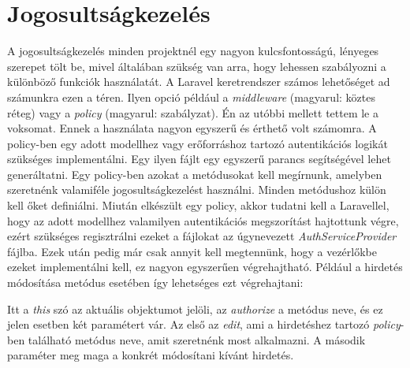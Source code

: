 \documentclass[]{thesis-ekf}
\theoremstyle{definition}
\theoremstyle{remark}
\begin{document}
	\section{Jogosultságkezelés}
		A jogosultságkezelés minden projektnél egy nagyon kulcsfontosságú, lényeges szerepet tölt be, mivel általában szükség van arra, hogy lehessen szabályozni a különböző funkciók használatát. A Laravel keretrendszer számos lehetőséget ad számunkra ezen a téren. Ilyen opció például a \emph{middleware} (magyarul: köztes réteg) vagy a \emph{policy} (magyarul: szabályzat). Én az utóbbi mellett tettem le a voksomat. Ennek a használata nagyon egyszerű és érthető volt számomra. A policy-ben egy adott modellhez vagy erőforráshoz tartozó autentikációs logikát szükséges implementálni. Egy ilyen fájlt egy egyszerű parancs segítségével lehet generáltatni. Egy policy-ben azokat a metódusokat kell megírnunk, amelyben szeretnénk valamiféle jogosultságkezelést használni. Minden metódushoz külön kell őket definiálni. Miután elkészült egy policy, akkor tudatni kell a Laravellel, hogy az adott modellhez valamilyen autentikációs megszorítást hajtottunk végre, ezért szükséges regisztrálni ezeket a fájlokat az úgynevezett \emph{AuthServiceProvider} fájlba. Ezek után pedig már csak annyit kell megtennünk, hogy a vezérlőkbe ezeket implementálni kell, ez nagyon egyszerűen végrehajtható. Például a hirdetés módosítása metódus esetében így lehetséges ezt végrehajtani: 
		
		Itt a \emph{this} szó az aktuális objektumot jelöli, az \emph{authorize} a metódus neve, és ez jelen esetben két paramétert vár. Az első az \emph{edit}, ami a hirdetéshez tartozó \emph{policy}-ben található metódus neve, amit szeretnénk most alkalmazni. A második paraméter meg maga a konkrét módosítani kívánt hirdetés.
		\cite{Laravel}
		
\end{document}
